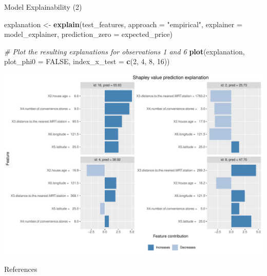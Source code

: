 \documentclass[12pt,ignorenonframetext,]{beamer}
\newif\ifbibliography
\newenvironment{Shaded}{\begin{snugshade}}{\end{snugshade}}
\newcommand{\CommentTok}[1]{\textcolor[rgb]{0.56,0.35,0.01}{\textit{#1}}}
\newcommand{\DataTypeTok}[1]{\textcolor[rgb]{0.13,0.29,0.53}{#1}}
\newcommand{\DecValTok}[1]{\textcolor[rgb]{0.00,0.00,0.81}{#1}}
\newcommand{\KeywordTok}[1]{\textcolor[rgb]{0.13,0.29,0.53}{\textbf{#1}}}
\newcommand{\NormalTok}[1]{#1}
\newcommand{\OtherTok}[1]{\textcolor[rgb]{0.56,0.35,0.01}{#1}}
\newcommand{\StringTok}[1]{\textcolor[rgb]{0.31,0.60,0.02}{#1}}
\begin{document}
\begin{frame}[fragile]{Model Explainability (2)}
\protect\hypertarget{model-explainability-2}{}

\tiny

\begin{Shaded}
\begin{Highlighting}[]
\NormalTok{explanation <-}\StringTok{ }\KeywordTok{explain}\NormalTok{(test_features, }\DataTypeTok{approach =} \StringTok{"empirical"}\NormalTok{, }
                       \DataTypeTok{explainer =}\NormalTok{ model_explainer, }\DataTypeTok{prediction_zero =}\NormalTok{ expected_price)}

\CommentTok{# Plot the resulting explanations for observations 1 and 6}
\KeywordTok{plot}\NormalTok{(explanation, }\DataTypeTok{plot_phi0 =} \OtherTok{FALSE}\NormalTok{, }\DataTypeTok{index_x_test =} \KeywordTok{c}\NormalTok{(}\DecValTok{2}\NormalTok{, }\DecValTok{4}\NormalTok{, }\DecValTok{8}\NormalTok{, }\DecValTok{16}\NormalTok{))}
\end{Highlighting}
\end{Shaded}

\begin{center}\includegraphics[width=0.8\linewidth,height=0.7\textheight]{figs/unnamed-chunk-26} \end{center}

\normalsize

\end{frame}

                    \renewcommand\refname{References}
              \begin{frame}[allowframebreaks]{References}
    \bibliographytrue
    
    \end{frame}
  
\end{document}
